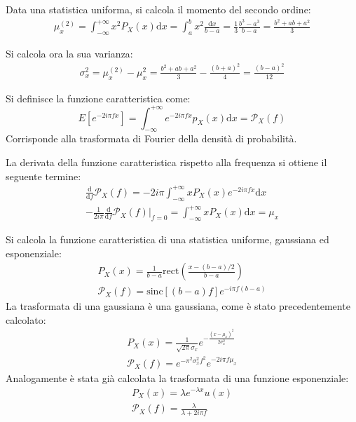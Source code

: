 \documentclass{article}
\newcommand{\rect}{\mathrm{rect}}
\newcommand{\sinc}{\mathrm{sinc}}
\newcommand{\df}{\mathrm{d}}
\numberwithin{equation}{subsection}
\begin{document}
Data una statistica uniforma, si calcola il momento del secondo ordine:
\begin{gather*}
    \mu_x^{(2)}=\displaystyle\int_{-\infty}^{+\infty}x^2P_X(x)\df x=\int_a^bx^2\frac{\df x}{b-a}=\frac{1}{3}\frac{b^3-a^3}{b-a}=\frac{b^2+ab+a^2}{3}
\end{gather*}

Si calcola ora la sua varianza:
\begin{gather*}
    \sigma_x^2=\mu_x^{(2)}-\mu_x^2=\displaystyle\frac{b^2+ab+a^2}{3}-\frac{(b+a)^2}{4}=\frac{(b-a)^2}{12}
\end{gather*}



Si definisce la funzione caratteristica come:
\begin{equation}
    E\left[e^{-2i\pi fx}\right]=\displaystyle\int_{-\infty}^{+\infty}e^{-2i\pi fx}p_X(x)\df x=\mathscr{P}_X(f)
\end{equation}
Corrisponde alla trasformata di Fourier della densità di probabilità. 

La derivata della funzione caratteristica rispetto alla frequenza si ottiene il seguente termine:
\begin{gather*}
    \displaystyle\frac{\df}{\df f}\mathscr{P}_X(f)=-2i\pi\int_{-\infty}^{+\infty}xP_X(x)e^{-2i\pi fx}\df x\\
    \displaystyle-\frac{1}{2i\pi}\frac{\df}{\df f}\mathscr{P}_X(f)\bigg|_{f=0}=\int_{-\infty}^{+\infty}xP_X(x)\df x=\mu_x
\end{gather*}

Si calcola la funzione caratteristica di una statistica uniforme, gaussiana ed esponenziale:
\begin{gather*}
    P_X(x)=\displaystyle\frac{1}{b-a}\rect\left(\frac{x-(b-a)/2}{b-a}\right)\\
    \mathscr{P}_X(f)=\displaystyle\sinc\left[(b-a)f\right]e^{-i\pi f(b-a)}
\end{gather*}
La trasformata di una gaussiana è una gaussiana, come è stato precedentemente calcolato: 
\begin{gather*}
    P_X(x)=\frac{1}{\sqrt{2\pi}\sigma_x}e^{-\frac{(x-\mu_x)^2}{2\sigma_x^2}}\\
    \mathscr{P}_X(f)=e^{-\pi^2\sigma_x^2f^2}e^{-2i\pi f\mu_x}
\end{gather*}
Analogamente è stata già calcolata la trasformata di una funzione esponenziale: 
\begin{gather*}
    P_X(x)=\lambda e^{-\lambda x}u(x)\\
    \mathscr{P}_X(f)=\displaystyle\frac{\lambda}{\lambda+2i\pi f}
\end{gather*}
\end{document}
